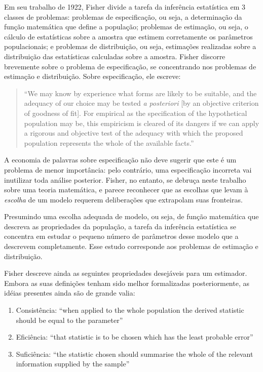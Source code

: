 Em seu trabalho de 1922, Fisher divide a tarefa da inferência estatística em 3 classes de 
problemas: problemas de especificação, ou seja, a determinação da função
matemática que define a população; problemas de estimação, ou seja, o cálculo de estatísticas sobre a amostra que estimem 
corretamente os parâmetros populacionais; e problemas de distribuição, ou seja, estimações realizadas sobre a distribuição
das estatísticas calculadas sobre a amostra. Fisher discorre brevemente sobre o problema de especificação,
se concentrando nos problemas de estimação e distribuição. Sobre especificação, ele escreve:

\begin{quote}
``We may know by experience what forms are likely to be suitable, and the adequacy of our choice may be
tested {\em a posteriori} [by an objective criterion of goodness of fit].
For empirical as the specification of the hypothetical population may be, this empiricism is cleared of its dangers if
we can apply a rigorous and objective test of the adequacy with which the proposed population represents the whole of
the available facts.''\citep{Fisher1922}
\end{quote}

A economia de palavras sobre especificação não deve sugerir que este é um problema de menor importância: pelo contrário,
uma especificação incorreta vai inutilizar toda análise posterior. Fisher, no entanto, se debruça neste trabalho sobre
uma teoria matemática, e parece reconhecer que as escolhas que levam à {\em escolha} de um modelo requerem deliberações
que extrapolam suas fronteiras.

Presumindo uma escolha adequada de modelo, ou seja,	de função matemática que descreva as propriedades da população,
a tarefa da inferência estatística se concentra em estudar o pequeno número de parâmetros desse modelo que a descrevem
completamente. Esse estudo corresponde aos problemas de estimação e distribuição.

Fisher descreve ainda as seguintes propriedades desejáveis para um estimador. Embora as suas definições tenham sido
melhor formalizadas posteriormente, as idéias presentes ainda são de grande valia:
\begin{enumerate}
	\item Consistência: ``when applied to the whole population the derived statistic should be equal to the parameter''
	\item Eficiência: ``that statistic is to be chosen which has the least probable error''
	\item Suficiência: ``the statistic chosen should summarise the whole of the relevant information supplied by the sample''
\end{enumerate}

